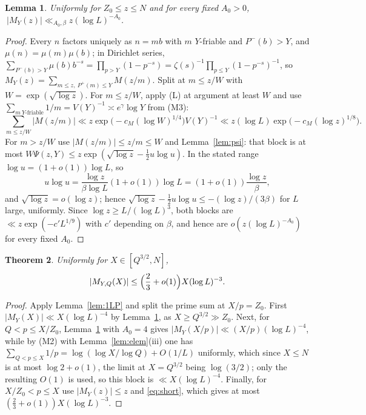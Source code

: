 \documentclass[11pt,a4paper]{article}
\theoremstyle{plain}
\newtheorem{theorem}{Theorem}
\newtheorem{lemma}[theorem]{Lemma}
\theoremstyle{definition}
\theoremstyle{remark}
\newcommand{\Pp}{P^{+}}
\newcommand{\Pm}{P^{-}}
\begin{document}
\begin{lemma}\label{lem:roughmob}
Uniformly for $Z_{0}\le z\le N$ and for every fixed $A_{0}>0$,
$\ |M_{Y}(z)|\ll_{A_{0},\beta}z(\log L)^{-A_{0}}$.
\end{lemma}

\begin{proof}
Every $n$ factors uniquely as $n=mb$ with $m$ $Y$-friable and $\Pm(b)>Y$, and $\mu(n)=\mu(m)\mu(b)$; in
Dirichlet series,
$\sum_{\Pm(b)>Y}\mu(b)b^{-s}=\prod_{p>Y}(1-p^{-s})=\zeta(s)^{-1}\prod_{p\le Y}(1-p^{-s})^{-1}$, so
$M_{Y}(z)=\sum_{m\le z,\ \Pp(m)\le Y}M(z/m)$. Split at $m\le z/W$ with $W=\exp(\sqrt{\log z})$. For
$m\le z/W$, apply (L) at argument at least $W$ and use
$\sum_{m\ Y\text{-friable}}1/m=V(Y)^{-1}\asymp e^{\gamma}\log Y$ from (M3):
\[
  \sum_{m\le z/W}|M(z/m)|\ll z\exp\bigl(-c_{M}(\log W)^{1/4}\bigr)V(Y)^{-1}
  \ll z(\log L)\exp\bigl(-c_{M}(\log z)^{1/8}\bigr).
\]
For $m>z/W$ use $|M(z/m)|\le z/m\le W$ and Lemma~\ref{lem:psi}: that block is at most
$W\Psi(z,Y)\le z\exp(\sqrt{\log z}-\frac12u\log u)$. In the stated range $\log u=(1+o(1))\log L$, so
\[
  u\log u=\frac{\log z}{\beta\log L}(1+o(1))\log L=(1+o(1))\frac{\log z}\beta,
\]
and $\sqrt{\log z}=o(\log z)$; hence $\sqrt{\log z}-\frac12u\log u\le-(\log z)/(3\beta)$ for $L$ large,
uniformly. Since $\log z\ge L/(\log L)^{3}$, both blocks are $\ll z\exp(-c'L^{1/9})$ with $c'$ depending on
$\beta$, and hence are $o(z(\log L)^{-A_0})$ for every fixed $A_0$.
\end{proof}

\begin{theorem}\label{thm:signed}
Uniformly for $X\in[Q^{3/2},N]$,
\[
  |M_{Y,Q}(X)|\le\Bigl(\frac23+o(1)\Bigr)X(\log L)^{-3}.
\]
\end{theorem}

\begin{proof}
Apply Lemma~\ref{lem:1LP} and split the prime sum at $X/p=Z_{0}$. First
$|M_{Y}(X)|\ll X(\log L)^{-4}$ by Lemma~\ref{lem:roughmob}, as $X\ge Q^{3/2}\gg Z_{0}$. Next, for
$Q<p\le X/Z_{0}$, Lemma~\ref{lem:roughmob} with $A_{0}=4$ gives $|M_{Y}(X/p)|\ll(X/p)(\log L)^{-4}$, while
by (M2) with Lemma~\ref{lem:elem}(iii) one has $\sum_{Q<p\le X}1/p=\log(\log X/\log Q)+O(1/L)$
uniformly, which since $X\le N$ is at most $\log2+o(1)$, the limit at $X=Q^{3/2}$ being $\log(3/2)$;
only the resulting $O(1)$ is used, so this block
is $\ll X(\log L)^{-4}$. Finally, for $X/Z_{0}<p\le X$ use $|M_{Y}(z)|\le z$ and \eqref{eq:short}, which
gives at most $(\frac23+o(1))X(\log L)^{-3}$.
\end{proof}
\end{document}
